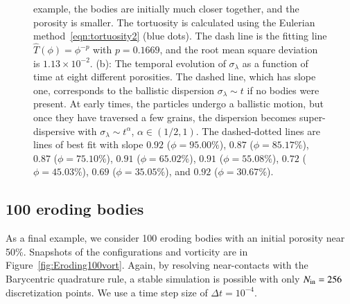 \documentclass[preprint,10pt]{elsarticle}
\begin{document}
\begin{figure}[H]
{example, the bodies are initially much closer together, and the porosity
is smaller.  The tortuosity is calculated using the Eulerian
method~\eqref{eqn:tortuosity2} (blue dots).  The dash line is the
fitting line $\widehat{T}(\phi)=\phi^{-p}$ with $p=0.1669$, and the root
mean square deviation is $1.13 \times 10^{-2}$.  (b): The temporal
evolution of $\sigma_\lambda$ as a function of time at eight different
porosities.  The dashed line, which has slope one, corresponds to the
ballistic dispersion $\sigma_\lambda \sim t$ if no bodies were present.
At early times, the particles undergo a ballistic motion, but once they
have traversed a few grains, the dispersion becomes super-dispersive
with $\sigma_\lambda \sim t^{\alpha}$, $\alpha \in (1/2,1)$.  The
dashed-dotted lines are lines of best fit with slope $0.92$
($\phi=95.00\%$), $0.87$ ($\phi=85.17\%$), $0.87$ ($\phi=75.10\%$),
$0.91$ ($\phi=65.02\%$), $0.91$ ($\phi=55.08\%$), $0.72$
($\phi=45.03\%$), $0.69$ ($\phi=35.05\%$), and $0.92$ ($\phi=30.67\%$).}
\end{figure}



\subsection{100 eroding bodies}
As a final example, we consider 100 eroding bodies with an initial
porosity near 50\%.  Snapshots of the configurations and vorticity are in
Figure~\ref{fig:Eroding100vort}.  Again, by resolving near-contacts with
the Barycentric quadrature rule, a stable simulation is possible with
only $N_{\mathrm{in}} = 256$ discretization points.  We use a time step size of
$\Delta t = 10^{-4}.$
\end{document}

